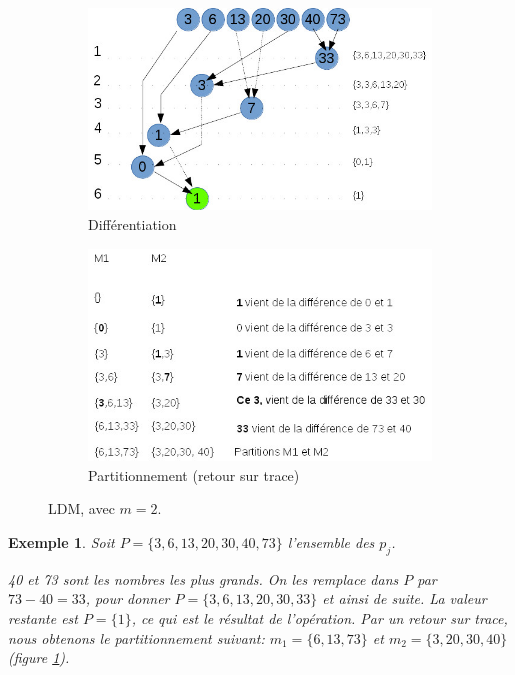\documentclass[a4paper,12pt]{report}
\theoremstyle{plain}				%
\newtheorem{example}{Exemple}
\theoremstyle{definition}				%
\begin{document}
\begin{itemize}
\begin{figure}
{\centering}
	\begin{subfigure}[b]{0.45\linewidth}
    \includegraphics[width=\linewidth]
    {Biblio_PCmax_Rendu_exLDM_1_2m.jpg}
    \caption{Différentiation}
  	\end{subfigure}
\hfill%
	\begin{subfigure}[b]{0.45\linewidth}
    \includegraphics[width=\linewidth]
    {Biblio_PCmax_Rendu_exLDM_2_2m.jpg}
    \caption{Partitionnement (retour sur trace)}
  	\end{subfigure}
  	\caption{LDM, avec $m=2$.}
  	\label{fig:LDM2M}
\end{figure}

\begin{example}
Soit $P=\{3,6,13,20,30,40,73\}$ l'ensemble des $p_j$.

40 et 73 sont les nombres les plus grands.
On les remplace dans $P$ par $73 - 40 = 33$, pour donner
$P=\{3,6,13,20,30,33\}$ et ainsi de suite.
La valeur restante est $P= \{1\}$, ce qui est le résultat de
l'opération.
Par un retour sur trace, nous obtenons le partitionnement suivant:
$m_1 = \{ 6,13,73 \}$ et $m_2 = \{ 3,20,30,40 \}$ (figure
\ref{fig:LDM2M}).


\end{example}
\end{itemize}
\end{document}
